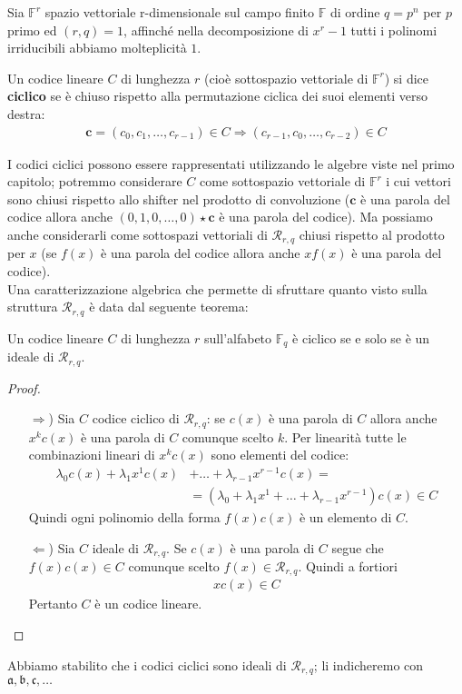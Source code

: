 Sia  $\mathbb{F}^{r}$ spazio vettoriale r-dimensionale sul campo finito $\mathbb{F}$ di ordine $q=p^n$ per $p$ primo ed $(r,q) = 1$, affinché nella decomposizione di $x^r-1$ tutti i polinomi irriducibili abbiamo molteplicità $1$.
\begin{definizione}
   Un codice lineare $C$ di lunghezza $r$ (cioè sottospazio vettoriale di $\mathbb{F}^{r}$) si dice {\bf ciclico} se è chiuso rispetto alla permutazione ciclica dei suoi elementi verso destra:
   \begin{align*}
      \mathbf{c} = (c_{0},c_{1}, \dots , c_{r-1}) \in C \Longrightarrow (c_{r-1},c_{0}, \dots , c_{r-2}) \in C
   \end{align*}
\end{definizione}
\noindent
I codici ciclici possono essere rappresentati utilizzando le algebre viste nel primo capitolo; potremmo considerare $C$ come sottospazio vettoriale di $\mathbb{F}^{r}$ i cui vettori sono chiusi rispetto allo shifter nel prodotto di convoluzione ($\mathbf{c}$ è una parola del codice allora anche $(0,1,0,\dots, 0) \star \mathbf{c}$ è una parola del codice). Ma possiamo anche considerarli come sottospazi vettoriali di $\mathcal{R}_{r, q}$ chiusi rispetto al prodotto per $x$ (se $f(x)$ è una parola del codice allora anche $xf(x)$ è una parola del codice). \\
Una caratterizzazione algebrica che permette di sfruttare quanto visto sulla struttura $\mathcal{R}_{r, q}$ è data dal seguente teorema:
\begin{teorema}
   Un codice lineare $C$ di lunghezza $r$ sull'alfabeto $\mathbb{F}_{q}$ è ciclico se e solo se è un ideale di $\mathcal{R}_{r, q}$.
\end{teorema}
\begin{proof}
      \begin{itemize}
   \item[$\Rightarrow$)] Sia $C$ codice ciclico di $\mathcal{R}_{r, q}$: se $c(x)$ è una parola di $C$ allora anche $x^{k}c(x)$ è una parola di $C$ comunque scelto $k$. Per linearità tutte le combinazioni lineari di $x^{k}c(x)$ sono elementi del codice:
   \begin{align*}
     \lambda_{0}c(x) + \lambda_{1}x^{1}c(x) &+ \dots + \lambda_{r-1}x^{r-1}c(x) = \\
     &= (\lambda_{0} + \lambda_{1}x^{1} + \dots + \lambda_{r-1}x^{r-1})c(x) \in C
   \end{align*}
   Quindi ogni polinomio della forma $f(x)c(x)$ è un elemento di $C$.
   \item[$\Leftarrow$)] Sia $C$ ideale di $\mathcal{R}_{r, q}$. Se $c(x)$ è una parola di $C$ segue che $f(x)c(x) \in C$ comunque scelto $f(x) \in \mathcal{R}_{r, q}$. Quindi a fortiori
   \begin{align*}
     xc(x) \in C
   \end{align*}
   Pertanto $C$ è un codice lineare.
\end{itemize}
\end{proof}
\noindent
Abbiamo stabilito che i codici ciclici sono ideali di $\mathcal{R}_{r, q}$; li indicheremo con $\mathfrak{a}, \mathfrak{b}, \mathfrak{c}, \dots$

